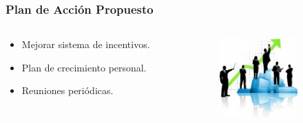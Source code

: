 \frame
{
\frametitle{Plan de Acción Propuesto}
\begin{columns}
	\begin{column}{0.6\textwidth}
		\begin{itemize}
			\item Mejorar sistema de incentivos.
			\item Plan de crecimiento personal.
			\item Reuniones periódicas.
		\end{itemize}
	\end{column}
    \begin{column}{0.4\textwidth}
        \includegraphics[width=3cm]{img/random_img_1}
    \end{column}
\end{columns}
}
